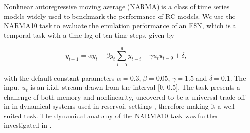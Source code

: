 Nonlinear autoregressive moving average (NARMA) \cite{atiya_new_2000} is a class
of time series models widely used to benchmark the performance of RC models. We
use the NARMA10 task to evaluate the emulation performance of an ESN, which is a
temporal task with a time-lag of ten time steps, given by


\begin{equation}
  y_{t+1} = \alpha y_{t} +
  \beta y_{t} \sum_{i=0}^{9}y_{t-i} +
  \gamma u_{t}u_{t-9} +
  \delta,
  \label{narma}
\end{equation}

\noindent with the default constant parameters $\alpha = 0.3$, $\beta = 0.05$,
$\gamma = 1.5$ and $\delta = 0.1$. The input $u_{t}$ is an i.i.d. stream drawn
from the interval [0, 0.5]. The task presents a challenge of both memory and
nonlinearity, uncovered to be a universal trade-off in in dynamical systems used
in reservoir settings \cite{dambre_information_2012, verstraeten_memory_2010},
therefore making it a well-suited task. The dynamical anatomy of the NARMA10
task was further investigated in \cite{kubota_dynamical_2019}.


